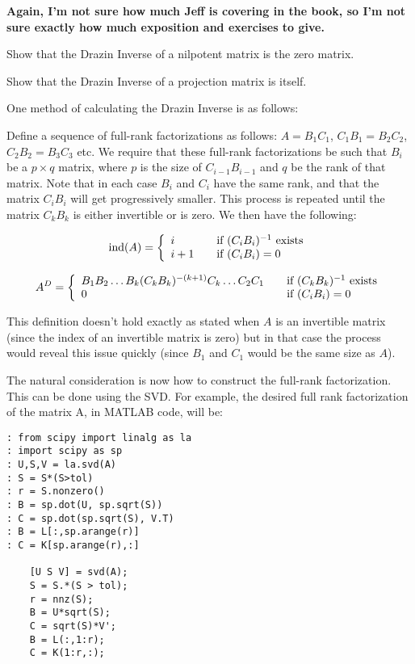 {\bf Again, I'm not sure how much Jeff is covering in the book, so I'm not sure exactly how much exposition and exercises to give.}
\begin{problem}
Show that the Drazin Inverse of a nilpotent matrix is the zero matrix.
\end{problem}

\begin{problem}
Show that the Drazin Inverse of a projection matrix is itself.
\end{problem}


One method of calculating the Drazin Inverse is as follows:

Define a sequence of full-rank factorizations as follows: $A = B_1 C_1$, $C_1 B_1 = B_2 C_2$, $C_2 B_2 = B_3 C_3$ etc. We require that these full-rank factorizations be such that $B_i$ be a $p \times q$ matrix, where $p$ is the size of $C_{i-1} B_{i-1}$ and $q$ be the rank of that matrix. Note that in each case $B_i$ and $C_i$ have the same rank, and that the matrix $C_i B_i$ will get progressively smaller. This process is repeated until the matrix $C_k B_k$ is either invertible or is zero. We then have the following:

\[
\text{ind}(A) = \left\{
\begin{array} {l l}
i & \quad \text{if  $(C_i B_i)^{-1}$ exists}\\
i+1 & \quad \text {if  $(C_i B_i) = 0$}\\
\end{array} \right.
\]

\[
A^D = \left\{
\begin{array} {l l}
B_1 B_2 \ldots B_k (C_k B_k)^{-(k+1)} C_k \ldots C_2 C_1 & \quad \text{if } (C_k B_k)^{-1} \text{ exists}\\
0 & \quad \text {if } (C_i B_i) = 0 \\
\end{array} \right.
\]

This definition doesn't hold exactly as stated when $A$ is an invertible matrix (since the index of an invertible matrix is zero) but in that case the process would reveal this issue quickly (since $B_1$ and $C_1$ would be the same size as $A$).

The natural consideration is now how to construct the full-rank factorization. This can be done using the SVD. For example, the desired full rank factorization of the matrix A, in MATLAB code, will be:

\begin{lstlisting}
: from scipy import linalg as la
: import scipy as sp
: U,S,V = la.svd(A)
: S = S*(S>tol)
: r = S.nonzero()
: B = sp.dot(U, sp.sqrt(S))
: C = sp.dot(sp.sqrt(S), V.T)
: B = L[:,sp.arange(r)]
: C = K[sp.arange(r),:]

    [U S V] = svd(A);
    S = S.*(S > tol);
    r = nnz(S);
    B = U*sqrt(S);
    C = sqrt(S)*V';
    B = L(:,1:r);
    C = K(1:r,:);
\end{lstlisting}

